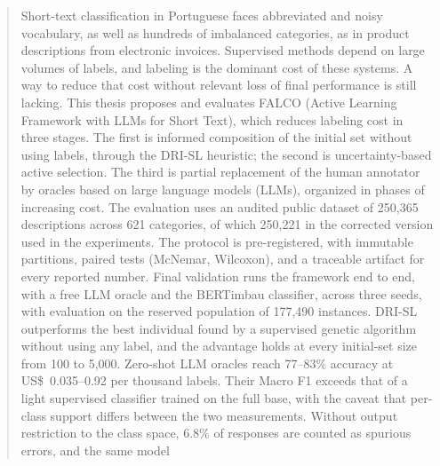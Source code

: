 %
%
%
\begin{abstract}

Short-text classification in Portuguese faces abbreviated and noisy
vocabulary, as well as hundreds of imbalanced categories, as in product
descriptions from electronic invoices. Supervised methods depend on large
volumes of labels, and labeling is the dominant cost of these systems. A way
to reduce that cost without relevant loss of final performance is still
lacking. This thesis proposes and evaluates FALCO (Active Learning Framework
with LLMs for Short Text), which reduces labeling cost in three stages. The
first is informed composition of the initial set without using labels,
through the DRI-SL heuristic; the second is uncertainty-based active
selection. The third is partial replacement of the human annotator by oracles
based on large language models (LLMs), organized in phases of increasing
cost. The evaluation uses an audited public dataset of 250,365 descriptions
across 621 categories, of which 250,221 in the corrected version used in the
experiments. The protocol is pre-registered, with immutable partitions,
paired tests (McNemar, Wilcoxon), and a traceable artifact for every reported
number. Final validation runs the framework end to end, with a free LLM
oracle and the BERTimbau classifier, across three seeds, with evaluation on
the reserved population of 177,490 instances. DRI-SL outperforms the best
individual found by a supervised genetic algorithm without using any label,
and the advantage holds at every initial-set size from 100 to 5,000.
Zero-shot LLM oracles reach 77--83\% accuracy at US\$~0.035--0.92 per
thousand labels. Their Macro F1 exceeds that of a light supervised classifier
trained on the full base, with the caveat that per-class support differs
between the two measurements. Without output restriction to the class space,
$6.8\%$ of responses are counted as spurious errors, and the same model

\end{abstract}
